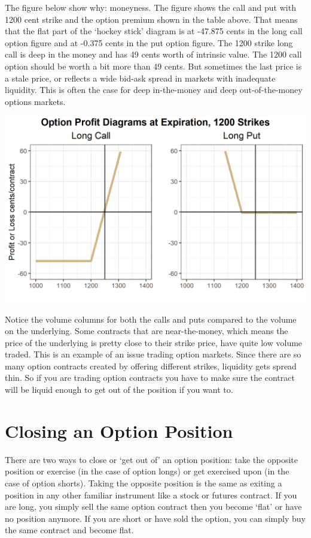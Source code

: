 \documentclass[
  letterpaper,
  DIV=11,
  numbers=noendperiod]{scrreprt}
\begin{document}
The figure below show why: moneyness. The figure shows the call and put
with 1200 cent strike and the option premium shown in the table above.
That means that the flat part of the `hockey stick' diagram is at
-47.875 cents in the long call option figure and at -0.375 cents in the
put option figure. The 1200 strike long call is deep in the money and
has 49 cents worth of intrinsic value. The 1200 call option should be
worth a bit more than 49 cents. But sometimes the last price is a stale
price, or reflects a wide bid-ask spread in markets with inadequate
liquidity. This is often the case for deep in-the-money and deep
out-of-the-money options markets.

\includegraphics{assets/Options1-optionmoneynessplot.png}

Notice the volume columns for both the calls and puts compared to the
volume on the underlying. Some contracts that are near-the-money, which
means the price of the underlying is pretty close to their strike price,
have quite low volume traded. This is an example of an issue trading
option markets. Since there are so many option contracts created by
offering different strikes, liquidity gets spread thin. So if you are
trading option contracts you have to make sure the contract will be
liquid enough to get out of the position if you want to.

\hypertarget{closing-an-option-position}{%
\section{Closing an Option Position}\label{closing-an-option-position}}

There are two ways to close or `get out of' an option position: take the
opposite position or exercise (in the case of option longs) or get
exercised upon (in the case of option shorts). Taking the opposite
position is the same as exiting a position in any other familiar
instrument like a stock or futures contract. If you are long, you simply
sell the same option contract then you become `flat' or have no position
anymore. If you are short or have sold the option, you can simply buy
the same contract and become flat.
\end{document}
